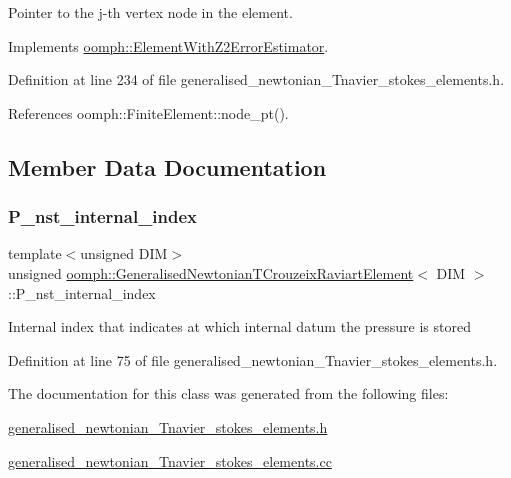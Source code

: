 Pointer to the j-\/th vertex node in the element. 



Implements \hyperlink{classoomph_1_1ElementWithZ2ErrorEstimator_a0eedccc33519f852c5dc2055ddf2774b}{oomph\+::\+Element\+With\+Z2\+Error\+Estimator}.



Definition at line 234 of file generalised\+\_\+newtonian\+\_\+\+Tnavier\+\_\+stokes\+\_\+elements.\+h.



References oomph\+::\+Finite\+Element\+::node\+\_\+pt().



\subsection{Member Data Documentation}
\mbox{\label{classoomph_1_1GeneralisedNewtonianTCrouzeixRaviartElement_ac37e19a65b07207a2ee8e1a5c1166369}} 
\subsubsection{\texorpdfstring{P\+\_\+nst\+\_\+internal\+\_\+index}{P\_nst\_internal\_index}}
{\footnotesize\ttfamily template$<$unsigned D\+IM$>$ \\
unsigned \hyperlink{classoomph_1_1GeneralisedNewtonianTCrouzeixRaviartElement}{oomph\+::\+Generalised\+Newtonian\+T\+Crouzeix\+Raviart\+Element}$<$ D\+IM $>$\+::P\+\_\+nst\+\_\+internal\+\_\+index\hspace{0.3cm}{\ttfamily [protected]}}

Internal index that indicates at which internal datum the pressure is stored 

Definition at line 75 of file generalised\+\_\+newtonian\+\_\+\+Tnavier\+\_\+stokes\+\_\+elements.\+h.



The documentation for this class was generated from the following files\+:\begin{DoxyCompactItemize}
\item 
\hyperlink{generalised__newtonian__Tnavier__stokes__elements_8h}{generalised\+\_\+newtonian\+\_\+\+Tnavier\+\_\+stokes\+\_\+elements.\+h}\item 
\hyperlink{generalised__newtonian__Tnavier__stokes__elements_8cc}{generalised\+\_\+newtonian\+\_\+\+Tnavier\+\_\+stokes\+\_\+elements.\+cc}\end{DoxyCompactItemize}
